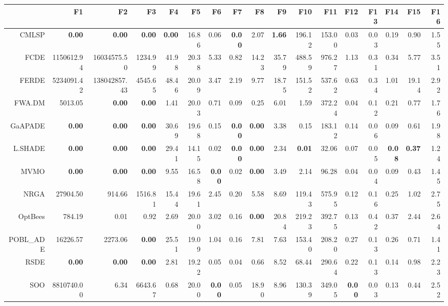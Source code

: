 \begin{table}[h!]
\centering
\begingroup\tiny
\begin{tabular}{rrrrrrrrrrrrrrrrr}
  \hline
 & F1 & F2 & F3 & F4 & F5 & F6 & F7 & F8 & F9 & F10 & F11 & F12 & F13 & F14 & F15 & F16 \\ 
  \hline
CMLSP & \textbf{0.00} & \textbf{0.00} & \textbf{0.00} & \textbf{0.00} & 16.86 & 0.06 & \textbf{0.00} & 2.07 & \textbf{1.66} & 196.12 & 153.00 & 0.03 & 0.03 & 0.19 & 0.90 & 1.55 \\ 
  FCDE & 1150612.94 & 16034575.50 & 1234.99 & 41.98 & 20.38 & 5.33 & 0.82 & 14.23 & 35.79 & 488.59 & 976.27 & 1.13 & 0.31 & 0.34 & 5.77 & 3.51 \\ 
  FERDE & 5234091.42 & 138042857.43 & 4545.65 & 48.46 & 20.09 & 3.47 & 2.19 & 9.77 & 18.75 & 151.52 & 537.62 & 0.63 & 0.34 & 1.01 & 19.14 & 2.92 \\ 
  FWA.DM & 5013.05 & \textbf{0.00} & \textbf{0.00} & 1.41 & 20.03 & 0.71 & 0.09 & 0.25 & 6.01 & 1.59 & 372.24 & 0.04 & 0.12 & 0.21 & 0.77 & 1.76 \\ 
  GaAPADE & \textbf{0.00} & \textbf{0.00} & \textbf{0.00} & 30.69 & 19.68 & 0.15 & \textbf{0.00} & \textbf{0.00} & 3.38 & 0.15 & 183.12 & 0.14 & 0.06 & 0.09 & 0.61 & 1.98 \\ 
  L.SHADE & \textbf{0.00} & \textbf{0.00} & \textbf{0.00} & 29.41 & 14.15 & 0.02 & \textbf{0.00} & \textbf{0.00} & 2.34 & \textbf{0.01} & 32.06 & 0.07 & 0.05 & \textbf{0.08} & \textbf{0.37} & 1.24 \\ 
  MVMO & \textbf{0.00} & \textbf{0.00} & \textbf{0.00} & 9.55 & 16.58 & \textbf{0.00} & 0.02 & \textbf{0.00} & 3.49 & 2.14 & 96.28 & 0.04 & 0.04 & 0.09 & 0.43 & 1.45 \\ 
  NRGA & 27904.50 & 914.66 & 1516.81 & 15.44 & 19.61 & 2.45 & 0.20 & 5.58 & 8.69 & 119.43 & 575.95 & 0.12 & 0.16 & 0.25 & 1.02 & 2.75 \\ 
  OptBees & 784.19 & 0.01 & 0.92 & 2.69 & 20.00 & 3.02 & 0.16 & \textbf{0.00} & 20.84 & 219.23 & 392.75 & 0.13 & 0.42 & 0.37 & 2.44 & 2.64 \\ 
  POBL\_ADE & 16226.57 & 2273.06 & \textbf{0.00} & 25.51 & 19.09 & 1.04 & 0.16 & 7.81 & 7.63 & 153.40 & 208.20 & 0.27 & 0.13 & 0.26 & 0.71 & 1.41 \\ 
  RSDE & \textbf{0.00} & \textbf{0.00} & \textbf{0.00} & 2.81 & 19.22 & 0.05 & 0.04 & 0.66 & 8.52 & 68.44 & 290.64 & 0.22 & 0.13 & 0.14 & 0.98 & 2.23 \\ 
  SOO & 8810740.00 & 6.34 & 6643.67 & 0.68 & 20.00 & \textbf{0.00} & 0.05 & 18.90 & 8.96 & 130.39 & 349.05 & \textbf{0.00} & 0.03 & 0.13 & 0.44 & 2.52 \\ 

\end{tabular}
\end{table}
